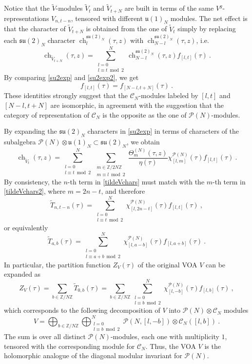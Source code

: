 \documentclass[11pt,reqno]{article}
\newcommand{\be}{\begin{equation}}
\newcommand{\ee}{\end{equation}}
\newcommand{\calC}{\mathcal{C}}
\newcommand{\ZZ}{\mathbb{Z}}
\newcommand{\paraf}{\mathcal{P}}
\newcommand{\alg}[1]{\mathfrak{#1}}
\DeclareMathOperator{\ch}{ch}
\begin{document}
 Notice that the $\tilde V$-modules $\tilde V_t$ and $\tilde V_{t+N}$ are built in terms of the same $V^g$-representations $V_{n,t-n}$, tensored with different $\alg{u}(1)_N$ modules. The net effect is that the character of $\tilde V_{t+N}$ is obtained from the one of $\tilde V_t$ simply by replacing each $\alg{su}(2)_N$ character $\ch^{\alg{su}(2)_N}_l(\tau,z)$ with $\ch^{\alg{su}(2)_N}_{N-l}(\tau,z)$, i.e.
\be\label{su2exp2} \ch_{\tilde V_{t+N}}(\tau,z)=\sum_{\substack{l=0\\ l\equiv t\bmod{2}}}^N\ch^{\alg{su}(2)_N}_{N-l}(\tau,z)f_{[l,t]}(\tau)\ .
\ee  By comparing \eqref{su2exp} and \eqref{su2exp2}, we get
\be f_{[l,t]}(\tau)=f_{[N-l,t+N]}(\tau)\ .
\ee These identities strongly suggest that the $\calC_N$-modules labeled by $[l,t]$ and $[N-l,t+N]$ are isomorphic, in agreement with the suggestion that the category of representation of $\calC_N$ is the opposite as the one of $\paraf(N)$-modules. 


By expanding the $\alg{su}(2)_N$ characters in \eqref{su2exp} in terms of characters of the subalgebra $\paraf(N)\otimes \alg{u}(1)_N\subset \alg{su}(2)_N$, we obtain
\be\label{tildeVchars2} \ch_{\tilde V_t}(\tau,z)=\sum_{\substack{l=0\\l\equiv t\bmod{2}}}^N\sum_{\substack{m\in \ZZ/2N\ZZ\\ m\equiv l\bmod{2}}}\frac{\Theta^{(N)}_{m}(\tau,z)}{\eta(\tau)}\chi^{\paraf(N)}_{[l,m]}(\tau)f_{[l,t]}(\tau)\ .
\ee 
By consistency, the $n$-th term in \eqref{tildeVchars} must match with the $m$-th term in \eqref{tildeVchars2}, where $m=2n-t$, and therefore
\be \tilde T_{n,t-n}(\tau)=\sum_{\substack{l=0\\l\equiv t\bmod{2}}}^N \chi^{\paraf(N)}_{[l,2n-t]}(\tau)f_{[l,t]}(\tau)\ ,
\ee or equivalently
\be \tilde T_{a,b}(\tau)=\sum_{\substack{l=0\\l\equiv a+b\bmod{2}}}^N \chi^{\paraf(N)}_{[l,a-b]}(\tau)f_{[l,a+b]}(\tau)\ .
\ee In particular, the partition function $Z_V(\tau)$ of the original VOA $V$ can be expanded as
\be\label{diaginvar} Z_V(\tau)=\sum_{b\in \ZZ/N\ZZ} \tilde T_{0,b}(\tau)=\sum_{b\in \ZZ/N\ZZ} \sum_{\substack{l=0\\l\equiv b\bmod{2}}}^N \chi^{\paraf(N)}_{[l,-b]}(\tau)f_{[l,b]}(\tau)\ ,
\ee which corresponds to the following decomposition of $V$ into $\paraf(N)\otimes \calC_N$ modules
\be V=\bigoplus_{b\in \ZZ/N\ZZ} \bigoplus_{\substack{l=0\\l\equiv b\bmod{2}}}^N \paraf(N,[l,-b])\otimes \calC_N([l,b])\ .
\ee
The sum is over all distinct $\paraf(N)$-modules, each one with multiplicity $1$, tensored with the corresponding module for $\calC_N$. Thus, the VOA $V$ is the holomorphic analogue of the diagonal modular invariant for $\paraf(N)$. 
\end{document}
